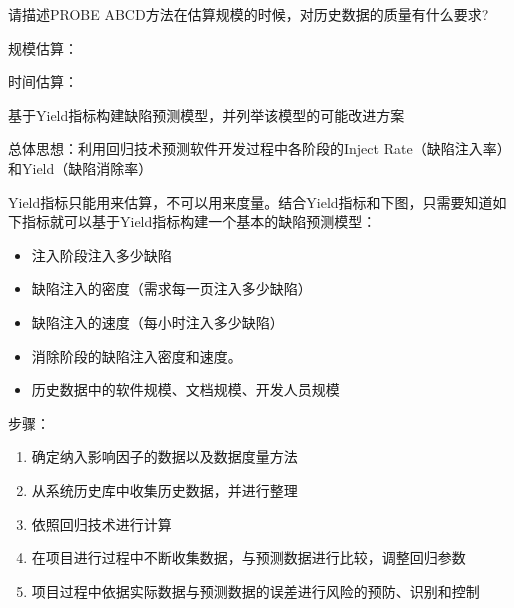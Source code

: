 \begin{problem}[2020]
请描述PROBE ABCD方法在估算规模的时候，对历史数据的质量有什么要求? 
\end{problem}

\begin{solution}
规模估算：


时间估算：

\end{solution}



\begin{problem}[2013、2021]
基于Yield指标构建缺陷预测模型，并列举该模型的可能改进方案
\end{problem}

\begin{solution}
总体思想：利用回归技术预测软件开发过程中各阶段的Inject Rate（缺陷注入率）和Yield（缺陷消除率）

Yield指标只能用来估算，不可以用来度量。结合Yield指标和下图，只需要知道如下指标就可以基于Yield指标构建一个基本的缺陷预测模型：
\vspace{-0.8em}
\begin{multicols}{2}
    \begin{itemize}
        \item 注入阶段注入多少缺陷
        \item 缺陷注入的密度（需求每一页注入多少缺陷）
        \item 缺陷注入的速度（每小时注入多少缺陷）
        \item 消除阶段的缺陷注入密度和速度。
        \item 历史数据中的软件规模、文档规模、开发人员规模
    \end{itemize}
\end{multicols}
\vspace{-1em}

步骤：
\vspace{-0.8em}
\begin{multicols}{2}
    \begin{enumerate}[label=\arabic*.]
        \item 确定纳入影响因子的数据以及数据度量方法
        \item 从系统历史库中收集历史数据，并进行整理
        \item 依照回归技术进行计算
        \item 在项目进行过程中不断收集数据，与预测数据进行比较，调整回归参数
        \item 项目过程中依据实际数据与预测数据的误差进行风险的预防、识别和控制
    \end{enumerate}
\end{multicols}
\vspace{-1em}


\end{solution}
